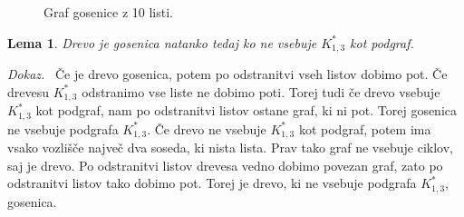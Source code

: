 \documentclass[a4paper, 12pt]{book}
\newtheorem{lema}{Lema}[chapter]
\newenvironment{dokaz}{\emph{Dokaz.}\ }{\hspace{\fill}{$\Box$}}
\begin{document}
\begin{figure}[h]
    \begin{center}        
    \end{center}
    \caption{Graf gosenice z 10 listi.}
    \label{graf_gosenice_10_listov}
\end{figure}


\begin{lema}
    Drevo je gosenica natanko tedaj ko ne vsebuje $K_{1,3}^*$ kot podgraf.
\end{lema}
\begin{dokaz}
    Če je drevo gosenica, potem po odstranitvi vseh listov dobimo pot. Če drevesu $K_{1,3}^*$ odstranimo vse liste ne dobimo poti. Torej tudi če drevo vsebuje $K_{1,3}^*$ kot podgraf, nam po odstranitvi listov ostane graf, ki ni pot. Torej gosenica ne vsebuje podgrafa $K_{1,3}^*$. Če drevo ne vsebuje $K_{1,3}^*$ kot podgraf, potem ima vsako vozlišče največ dva soseda, ki nista lista. Prav tako graf ne vsebuje ciklov, saj je drevo. Po odstranitvi listov drevesa vedno dobimo povezan graf, zato po odstranitvi listov tako dobimo pot. Torej je drevo, ki ne vsebuje podgrafa $K_{1,3}^*$, gosenica.
\end{dokaz}
\end{document}
